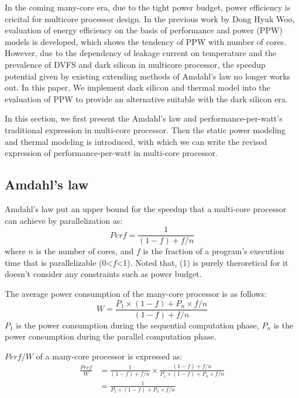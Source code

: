 In the coming many-core era, due to the tight power budget, power efficiency is cricital for multicore processor design. In the previous work by Dong Hyuk Woo, evaluation of energy efficiency on the basis of performance and power (PPW) models is developed, which shows the tendency of PPW with number of cores. However, due to the dependency of leakage current on temperature and the prevalence of DVFS and dark silicon in multicore processor, the speedup potential given by existing extending methods of Amdahl's law no longer works out. In this paper, We implement dark silicon and thermal model into the evaluation of PPW to provide an alternative suitable with the dark silicon era.

In this section, we first present the Amdahl's law and performance-per-watt's traditional expression in multi-core processor. Then the static power modeling and thermal modeling is introduced, with which we can write the revised expression of performance-per-watt in multi-core processor.

\subsection{Amdahl's law}
Amdahl's law put an upper bound for the speedup that a multi-core processor can achieve by parallelization as:
\begin{equation}\label{speedup}
Perf = \frac{1} {(1-f)+f/n}
\end{equation}
where $n$ is the number of cores, and $f$ is the fraction of a program's execution time that is parallelizable (0<$f$<1). Noted that, (1) is purely theroretical for it doesn't consider any constraints such as power budget.

The average power consumption of the many-core processor is as follows:
\begin{equation}\label{average_power}
W = \frac{P_{1} \times (1-f)+P_{n} \times f/n}{(1-f)+f/n}
\end{equation}
$P_{1}$ is the power consumption during the sequential computation phase, $P_{n}$ is the power consumption during the parallel computation phase.

$Perf/W$ of a many-core processor is expressed as:
\begin{equation}\label{ppw}
\begin{split}
\frac{Perf}{W} &= \frac{1}{(1-f)+f/n} \times \frac{(1-f)+f/n}{P_{1} \times (1-f)+P_{n} \times f/n}\\
&= \frac{1}{P_{1} \times (1-f)+P_{n} \times f/n}
\end{split}
\end{equation}

